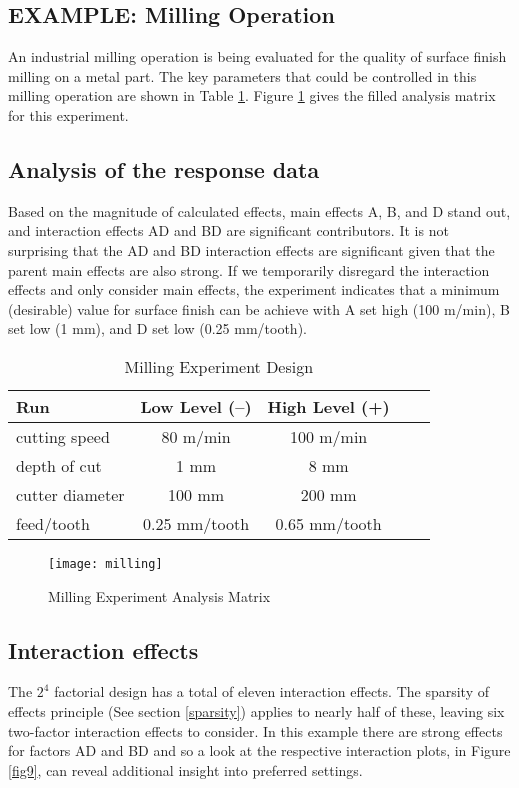 \subsection{EXAMPLE: Milling Operation}
An industrial milling operation is being evaluated for the quality of surface finish milling on a metal part.  The key parameters that could be controlled in this milling operation are shown in Table \ref{tab8}. Figure \ref{fig8} gives the filled analysis matrix for this experiment.

\subsection{Analysis of the response data}
Based on the magnitude of calculated effects, main effects A, B, and D stand out, and interaction effects AD and BD are significant contributors.  It is not surprising that the AD and BD interaction effects are significant given that the parent main effects are also strong. If we temporarily disregard the interaction effects and only consider main effects, the experiment indicates that a minimum (desirable) value for surface finish can be achieve with A set high (100 m/min), B set low (1 mm), and D set low (0.25 mm/tooth).\label{maineff}

\begin{table}[h]\caption{Milling Experiment Design}\label{tab8}
\begin{center}
\begin{tabular}{|l|c|c|c|c|}
\hline Run & Low Level (--) & High Level (+)  \\ 
\hline cutting speed & 80 m/min & 100 m/min  \\
\hline depth of cut & 1 mm & 8 mm \\
\hline cutter diameter & 100 mm & 200 mm\\
\hline feed/tooth & 0.25 mm/tooth & 0.65 mm/tooth \\
\hline
\end{tabular} 
\end{center}
\end{table}

\begin{figure}[h]\caption{Milling Experiment Analysis Matrix}\label{fig8}
\begin{center}
\texttt{[image: milling]}
\end{center}
\end{figure}

\subsection{Interaction effects}
The $2^{4}$ factorial design has a total of eleven interaction effects.  The sparsity of effects principle (See section \ref{sparsity}) applies to nearly half of these, leaving six two-factor interaction effects to consider.  In this example there are strong effects for factors AD and BD and so a look at the respective interaction plots, in Figure \ref{fig9}, can reveal additional insight into preferred settings.

